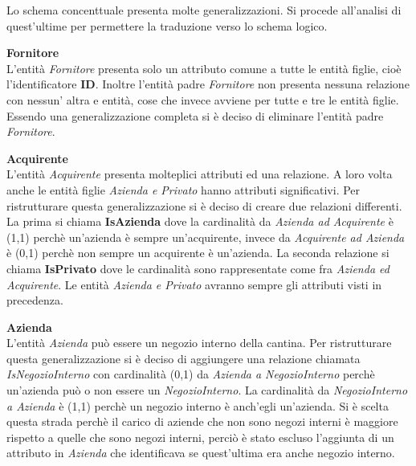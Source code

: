 Lo schema concenttuale presenta molte generalizzazioni. Si procede all'analisi di quest'ultime per permettere la traduzione verso lo schema logico.\\

\begin{flushleft}
	\textbf{\large{Fornitore}}\\
	L'entità \emph{Fornitore} presenta solo un attributo comune a tutte le entità figlie, cioè l'identificatore \textbf{ID}. Inoltre l'entità padre \emph{Fornitore} non presenta nessuna relazione con nessun' altra e entità, cose che invece avviene per tutte e tre le entità figlie. Essendo una generalizzazione completa si è deciso di eliminare l'entità padre \emph{Fornitore}. 
\end{flushleft}


\begin{flushleft}
	\textbf{\large{Acquirente}}\\
	L'entità \emph{Acquirente} presenta molteplici attributi ed una relazione. A loro volta anche le entità figlie \emph{Azienda e Privato} hanno attributi significativi. Per ristrutturare questa generalizzazione si è deciso di creare due relazioni differenti. La prima si chiama \textbf{IsAzienda} dove la cardinalità da \emph{Azienda ad Acquirente} è (1,1) perchè un'azienda è sempre un'acquirente, invece da \emph{Acquirente ad Azienda} è (0,1) perchè non sempre un acquirente è un'azienda.
	La seconda relazione si chiama \textbf{IsPrivato} dove le cardinalità sono rappresentate come fra \emph{Azienda ed Acquirente}. Le entità \emph{Azienda e Privato} avranno sempre gli attributi visti in precedenza.
\end{flushleft}

\begin{flushleft}
	\textbf{\large{Azienda}}\\
	L'entità \emph{Azienda} può essere un negozio interno della cantina. Per ristrutturare questa generalizzazione si è deciso di aggiungere una relazione chiamata \emph{IsNegozioInterno} con cardinalità (0,1) da \emph{Azienda a NegozioInterno} perchè un'azienda può o non essere un \emph{NegozioInterno}. La cardinalità da \emph{NegozioInterno a Azienda} è (1,1) perchè un negozio interno è anch'egli un'azienda. Si è scelta questa strada perchè il carico di aziende che non sono negozi interni è maggiore rispetto a quelle che sono negozi interni, perciò è stato escluso l'aggiunta di un attributo in \emph{Azienda} che identificava se quest'ultima era anche negozio interno.
\end{flushleft}


